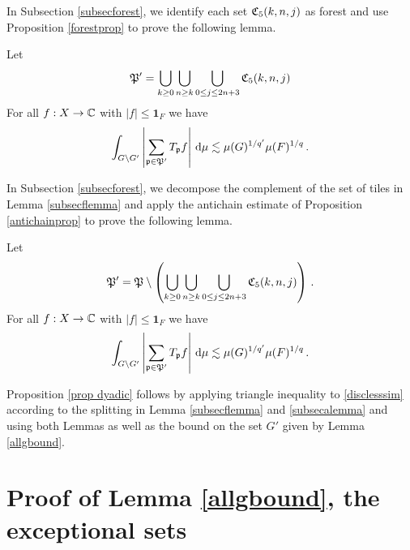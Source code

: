 In Subsection \ref{subsecforest}, we identify each set $\mathfrak C_5(k,n,j)$ as forest and use Proposition
\ref{forestprop} to prove the following lemma.


\begin{lemma}\label{subsecflemma}
    Let
    \begin{equation}
        \mathfrak P'=\bigcup_{k\ge 0}\bigcup_{n\ge k}
        \bigcup_{0\le j\le 2n+3}\mathfrak C_5(k,n,j)
    \end{equation}
    For all $f:X\to \mathbb{C}$ with $|f|\le \mathbf{1}_F$ we have
\begin{equation}
    \label{disclesssim1}
    \int_{G \setminus  G'} \left|\sum_{\mathfrak p \in \mathfrak P'} T_{\mathfrak p} f \right|\, \mathrm{d}\mu  \lesssim \mu(G)^{1/q'} \mu(F)^{1/q}\,.
\end{equation}
\end{lemma}

In Subsection \ref{subsecforest}, we decompose
the complement of the set of tiles in Lemma
\ref{subsecflemma} and apply the antichain estimate of
Proposition \ref{antichainprop} to prove the following lemma.

\begin{lemma}\label{subsecalemma}
    Let
    \begin{equation}
        \mathfrak P'=\mathfrak P\setminus \left(\bigcup_{k\ge 0}\bigcup_{n\ge k}
        \bigcup_{0\le j\le 2n+3}\mathfrak C_5(k,n,j)\right)\,.
    \end{equation}
    For all $f:X\to \mathbb{C}$ with $|f|\le \mathbf{1}_F$ we have
\begin{equation}
    \label{disclesssim2}
    \int_{G \setminus  G'} \left|\sum_{\mathfrak p \in \mathfrak P'} T_{\mathfrak p} f\right| \, \mathrm{d}\mu  \lesssim \mu(G)^{1/q'} \mu(F)^{1/q}\,.
\end{equation}
\end{lemma}
Proposition \ref{prop dyadic} follows by applying
triangle inequality to \eqref{disclesssim}
according to the splitting in Lemma \ref{subsecflemma}
and \ref{subsecalemma} and using both Lemmas as well
as the bound on the set $G'$ given by Lemma \ref{allgbound}.



\section{Proof of Lemma \ref{allgbound}, the exceptional sets}
\label{subsetexcset}


